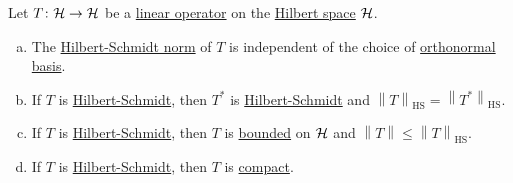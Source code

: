 \begin{proposition}
	Let \(T\colon \mathcal{\MakeUppercase{h}} \to \mathcal{\MakeUppercase{h}} \) be a \hyperref[def:linear-op]{linear operator} on the \hyperref[def:Hilbert-space]{Hilbert space} \(\mathcal{\MakeUppercase{h}} \).
	\begin{enumerate}[(a)]
		\item The \hyperref[def:Hilbert-Schmidt-norm]{Hilbert-Schmidt norm} of \(T\) is independent of the choice of \hyperref[def:orthonormal-system]{orthonormal basis}.
		\item If \(T\) is \hyperref[def:Hilbert-Schmidt-op]{Hilbert-Schmidt}, then \(T^{\ast} \) is \hyperref[def:Hilbert-Schmidt-op]{Hilbert-Schmidt} and \(\left\lVert T\right\rVert _{\mathrm{HS} } = \left\lVert T^{\ast} \right\rVert _{\mathrm{HS} } \).
		\item If \(T\) is \hyperref[def:Hilbert-Schmidt-op]{Hilbert-Schmidt}, then \(T\) is \hyperref[def:bounded-linear-op]{bounded} on \(\mathcal{\MakeUppercase{h}} \) and \(\left\lVert T\right\rVert \leq \left\lVert T\right\rVert _{\mathrm{HS} }\).
		\item If \(T\) is \hyperref[def:Hilbert-Schmidt-op]{Hilbert-Schmidt}, then \(T\) is \hyperref[def:compact-op]{compact}.
	\end{enumerate}
\end{proposition}
